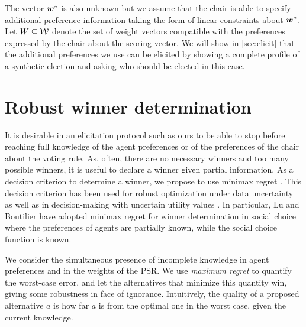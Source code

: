\documentclass[runningheads]{llncs}
\theoremstyle{remark}
\begin{document}
The vector $\bm{w}^*$  is also unknown but we assume that the chair is able to specify additional preference information taking the form of linear constraints about $\bm{w}^*$. Let $W \subseteq \mathcal{W}$ denote the set of weight vectors compatible with the preferences expressed by the chair about the scoring vector.
We will show in \cref{sec:elicit} that the additional preferences we use can be elicited by showing a complete profile of a synthetic election and asking who should be elected in this case.

\section{Robust winner determination}
\label{sec:mmr}
It is desirable in an elicitation protocol such as ours to be able to stop before reaching full knowledge of the agent preferences or of the preferences of the chair about the voting rule. As, often, there are no necessary winners and too many possible winners, it is useful to declare a winner given partial information.
As a decision criterion to determine a winner, we propose to use minimax regret \cite{Savage1954}. 
This decision criterion has been used for robust optimization under data uncertainty \cite{Kouvelis1997} as well as in decision-making with uncertain utility values \cite{Salo2001,Boutilier2006}.
In particular, Lu and Boutilier \cite{Lu2011} have adopted minimax regret for winner determination in social choice where
the preferences of agents are partially known, while the social choice function is known.

We consider the simultaneous presence of incomplete knowledge in agent preferences and in the weights of the PSR.
We use \emph{maximum regret} to quantify the worst-case error, and let the alternatives that minimize this quantity win, giving some robustness in face of ignorance.
Intuitively, the quality of a proposed alternative $a$ is how far $a$ is from the optimal one in the worst case, given the current knowledge.
\end{document}
